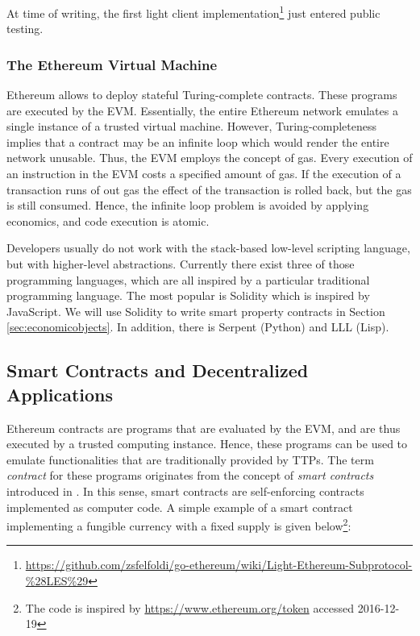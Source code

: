 At time of writing, the first light client implementation\footnote{\url{https://github.com/zsfelfoldi/go-ethereum/wiki/Light-Ethereum-Subprotocol-\%28LES\%29}} just entered public testing.

\subsubsection{The Ethereum Virtual Machine}

Ethereum allows to deploy stateful Turing-complete contracts. These programs are executed by the \ac{EVM}. Essentially, the entire Ethereum network emulates a single instance of a trusted virtual machine. 
However, Turing-completeness implies that a contract may be an infinite loop which would render the entire network unusable. Thus, the \ac{EVM} employs the concept of gas. Every execution of an instruction in the \ac{EVM} costs a specified amount of gas. If the execution of a transaction runs of out gas the effect of the transaction is rolled back, but the gas is still consumed. Hence, the infinite loop problem is avoided by applying economics, and code execution is atomic.

Developers usually do not work with the stack-based low-level scripting language, but with higher-level abstractions. Currently there exist three of those programming languages, which are all inspired by a particular traditional programming language. The most popular is Solidity which is inspired by JavaScript. We will use Solidity to write smart property contracts in Section \ref{sec:economicobjects}. In addition, there is Serpent (Python) and LLL (Lisp).


\subsection{Smart Contracts and Decentralized Applications}

Ethereum contracts are programs that are evaluated by the \ac{EVM}, and are thus executed by a trusted computing instance. Hence, these programs can be used to emulate functionalities that are traditionally provided by \ac{TTP}s. The term \emph{contract} for these programs originates from the concept of \emph{smart contracts} introduced in \parencite{szabo1997}. In this sense, smart contracts are self-enforcing contracts implemented as computer code. A simple example of a smart contract implementing a fungible currency with a fixed supply is given below\footnote{The code is inspired by \url{https://www.ethereum.org/token} accessed 2016-12-19}:

